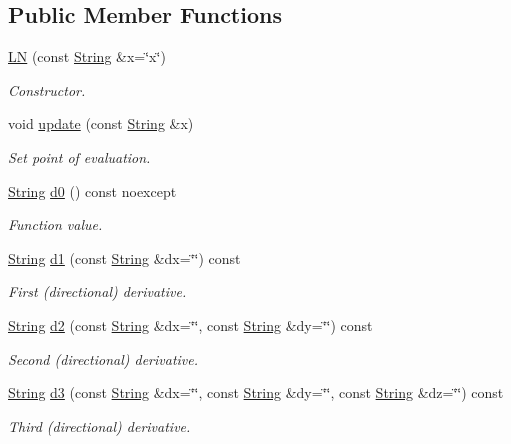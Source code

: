\subsection*{Public Member Functions}
\begin{DoxyCompactItemize}
\item 
\hyperlink{structFunG_1_1stringify_1_1LN_a27f182c8cc57cebe4b0463ed276d119e}{L\-N} (const \hyperlink{structFunG_1_1String}{String} \&x=\char`\"{}x\char`\"{})
\begin{DoxyCompactList}\small\item\em Constructor. \end{DoxyCompactList}\item 
void \hyperlink{structFunG_1_1stringify_1_1LN_aa350fa6848e94377ca4c985a440445e3}{update} (const \hyperlink{structFunG_1_1String}{String} \&x)
\begin{DoxyCompactList}\small\item\em Set point of evaluation. \end{DoxyCompactList}\item 
\hyperlink{structFunG_1_1String}{String} \hyperlink{structFunG_1_1stringify_1_1LN_abea0b27e81113e4bfb5acdb5073182cd}{d0} () const noexcept
\begin{DoxyCompactList}\small\item\em Function value. \end{DoxyCompactList}\item 
\hyperlink{structFunG_1_1String}{String} \hyperlink{structFunG_1_1stringify_1_1LN_af9705c416c225c0ebd78316444ab26c4}{d1} (const \hyperlink{structFunG_1_1String}{String} \&dx=\char`\"{}\char`\"{}) const 
\begin{DoxyCompactList}\small\item\em First (directional) derivative. \end{DoxyCompactList}\item 
\hyperlink{structFunG_1_1String}{String} \hyperlink{structFunG_1_1stringify_1_1LN_a1379edb471691b5ab6b34701896033ae}{d2} (const \hyperlink{structFunG_1_1String}{String} \&dx=\char`\"{}\char`\"{}, const \hyperlink{structFunG_1_1String}{String} \&dy=\char`\"{}\char`\"{}) const 
\begin{DoxyCompactList}\small\item\em Second (directional) derivative. \end{DoxyCompactList}\item 
\hyperlink{structFunG_1_1String}{String} \hyperlink{structFunG_1_1stringify_1_1LN_aeeabb2c2cc220b6350ac1040b879086b}{d3} (const \hyperlink{structFunG_1_1String}{String} \&dx=\char`\"{}\char`\"{}, const \hyperlink{structFunG_1_1String}{String} \&dy=\char`\"{}\char`\"{}, const \hyperlink{structFunG_1_1String}{String} \&dz=\char`\"{}\char`\"{}) const 
\begin{DoxyCompactList}\small\item\em Third (directional) derivative. \end{DoxyCompactList}\end{DoxyCompactItemize}


